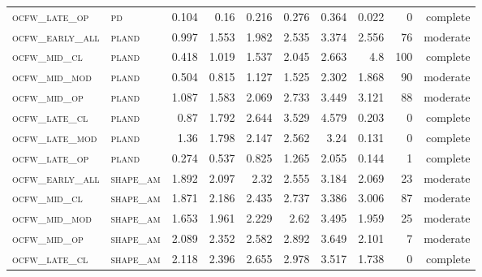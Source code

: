\begin{landscape}
\begin{center}
\begin{footnotesize}
\begin{longtable}{llrrrrr|rrr}
\textsc{ocfw\_late\_op  } & \textsc{pd        }    & 0.104    & 0.16     & 0.216    & 0.276    & 0.364      & 0.022         & 0             & complete            \\
\textsc{ocfw\_early\_all} & \textsc{pland     }    & 0.997    & 1.553    & 1.982    & 2.535    & 3.374      & 2.556         & 76            & moderate        \\
\textsc{ocfw\_mid\_cl   } & \textsc{pland     }    & 0.418    & 1.019    & 1.537    & 2.045    & 2.663      & 4.8           & 100           & complete             \\
\textsc{ocfw\_mid\_mod  } & \textsc{pland     }    & 0.504    & 0.815    & 1.127    & 1.525    & 2.302      & 1.868         & 90            & moderate        \\
\textsc{ocfw\_mid\_op   } & \textsc{pland     }    & 1.087    & 1.583    & 2.069    & 2.733    & 3.449      & 3.121         & 88            & moderate        \\
\textsc{ocfw\_late\_cl  } & \textsc{pland     }    & 0.87     & 1.792    & 2.644    & 3.529    & 4.579      & 0.203         & 0             & complete            \\
\textsc{ocfw\_late\_mod } & \textsc{pland     }    & 1.36     & 1.798    & 2.147    & 2.562    & 3.24       & 0.131         & 0             & complete            \\
\textsc{ocfw\_late\_op  } & \textsc{pland     }    & 0.274    & 0.537    & 0.825    & 1.265    & 2.055      & 0.144         & 1             & complete        \\
\textsc{ocfw\_early\_all} & \textsc{shape\_am }    & 1.892    & 2.097    & 2.32     & 2.555    & 3.184      & 2.069         & 23            & moderate        \\
\textsc{ocfw\_mid\_cl   } & \textsc{shape\_am }    & 1.871    & 2.186    & 2.435    & 2.737    & 3.386      & 3.006         & 87            & moderate        \\
\textsc{ocfw\_mid\_mod  } & \textsc{shape\_am }    & 1.653    & 1.961    & 2.229    & 2.62     & 3.495      & 1.959         & 25            & moderate        \\
\textsc{ocfw\_mid\_op   } & \textsc{shape\_am }    & 2.089    & 2.352    & 2.582    & 2.892    & 3.649      & 2.101         & 7             & moderate        \\
\textsc{ocfw\_late\_cl  } & \textsc{shape\_am }    & 2.118    & 2.396    & 2.655    & 2.978    & 3.517      & 1.738         & 0             & complete            \\

\end{longtable}
\end{footnotesize}
\end{center}
\end{landscape}
